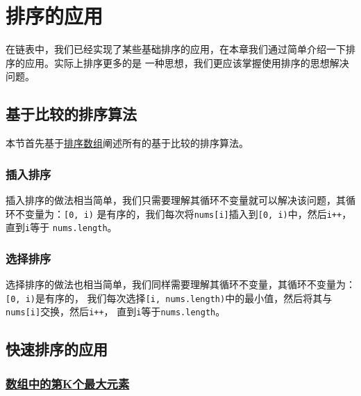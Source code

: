 \documentclass[../../main.tex]{subfiles}
\begin{document}
\setchapterpreamble[u]{\margintoc}

\chapter{排序的应用}

在链表中，我们已经实现了某些基础排序的应用，在本章我们通过简单介绍一下排序的应用。实际上排序更多的是
一种思想，我们更应该掌握使用排序的思想解决问题。

\section{基于比较的排序算法}

本节首先基于\href{https://leetcode.cn/problems/sort-an-array/}{排序数组}阐述所有的基于比较的排序算法。

\subsection{插入排序}

插入排序的做法相当简单，我们只需要理解其循环不变量就可以解决该问题，其循环不变量为：\texttt{[0, i)}
是有序的，我们每次将\texttt{nums[i]}插入到\texttt{[0, i)}中，然后\texttt{i++}，直到\texttt{i}等于
\texttt{nums.length}。



\subsection{选择排序}

选择排序的做法也相当简单，我们同样需要理解其循环不变量，其循环不变量为：\texttt{[0, i)}是有序的，
我们每次选择\texttt{[i, nums.length)}中的最小值，然后将其与\texttt{nums[i]}交换，然后\texttt{i++}，
直到\texttt{i}等于\texttt{nums.length}。



\section{快速排序的应用}

\subsection{\href{https://leetcode.cn/problems/kth-largest-element-in-an-array/}
{数组中的第K个最大元素}}
\end{document}
